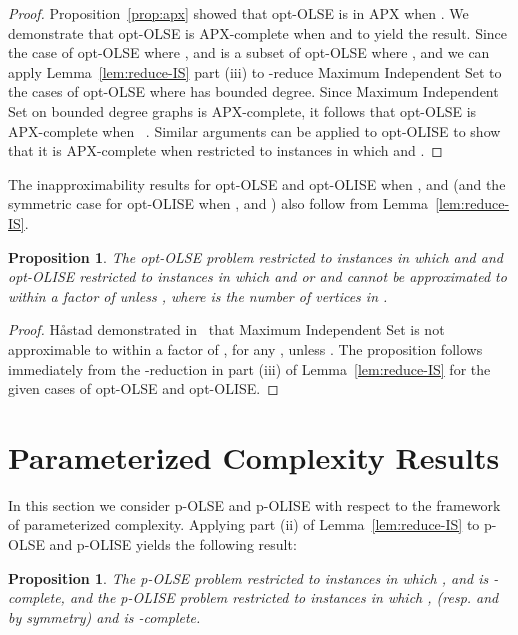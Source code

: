 \documentclass[11pt]{article}
\newtheorem{proposition}[theorem]{Proposition}
\begin{document}
\begin{proof}
Proposition~\ref{prop:apx} showed that opt-OLSE is in APX when . We demonstrate that opt-OLSE is APX-complete when  and  to yield the result. Since the case of opt-OLSE where ,  and  is a subset of opt-OLSE where ,  and  we can apply Lemma~\ref{lem:reduce-IS} part (iii) to -reduce {\sc Maximum Independent Set} to the cases of opt-OLSE where  has bounded degree.  Since {\sc Maximum Independent Set} on bounded degree graphs is APX-complete, it follows that opt-OLSE is APX-complete when ~\cite{py91}.  Similar arguments can be applied to opt-OLISE to show that it is APX-complete when restricted to instances in which  and .
\end{proof}

The inapproximability results for opt-OLSE and opt-OLISE when ,  and  (and the symmetric case for opt-OLISE when  ,  and ) also follow from Lemma~\ref{lem:reduce-IS}.

\begin{proposition}\label{prop:no-apx}
The opt-OLSE problem restricted to instances in which  and  and opt-OLISE restricted to instances in which  and  or  and  cannot be approximated to within a factor of  unless , where  is the number of vertices in .
\end{proposition}

\begin{proof}
H\r{a}stad demonstrated in~\cite{hastad97} that {\sc Maximum Independent Set} is not approximable to within a factor of , for any , unless .  The proposition follows immediately from the -reduction in part (iii) of Lemma~\ref{lem:reduce-IS} for the given cases of opt-OLSE and opt-OLISE.
\end{proof}

\section{Parameterized Complexity Results}\label{subsec:parameterized}

In this section we consider p-OLSE and p-OLISE with respect to the framework of parameterized complexity. Applying part (ii) of Lemma~\ref{lem:reduce-IS} to p-OLSE and p-OLISE yields the following result:

\begin{proposition}
\label{prop:whardness1}
The p-OLSE problem restricted to instances in which ,  and  is -complete, and the p-OLISE problem restricted to instances in which ,  (resp.  and  by symmetry) and  is -complete.
\end{proposition}
\end{document}
